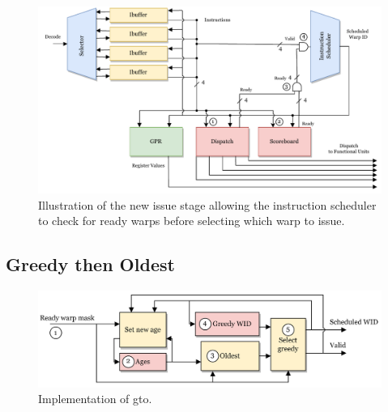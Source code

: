\begin{figure}
    \centering
    \includegraphics[width=\textwidth]{figures/new_issue_stage.pdf}
    \caption[Illustration of the new issue stage.]{Illustration of the new issue stage allowing the instruction scheduler to check for ready warps before selecting which warp to issue.}
    \label{fig:new_issue_stage}
\end{figure}


\subsection{Greedy then Oldest}

\begin{figure}
    \centering
    \includegraphics[width=\textwidth]{figures/gto_numbers.png}
    \caption{Implementation of \acrfull{gto}.}
    \label{fig:gto_impl}
\end{figure}

